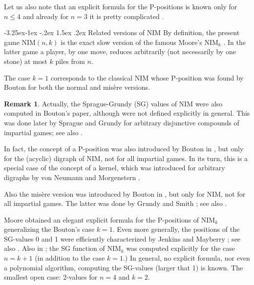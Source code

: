 \documentclass[10pt]{article}
\makeatletter
\renewcommand\subsection{\@startsection{subsection}{2}{\z@}
{-3.25ex\@plus -1ex \@minus -.2ex}
{1.5ex \@plus .2ex}
{\normalfont\normalsize\bfseries\boldmath}}
\theoremstyle{definition}
\newtheorem{remark}{Remark}
\makeatother
\begin{document}
Let us also note that 
an explicit formula for the P-positions is known 
only for $n \leq 4$  
and already for $n=3$ %
it is pretty complicated 
\cite{GHHC20}\cite[Appendix]{GMMV23}.

\subsection{Related versions of NIM} 
By definition, the present game NIM$(n,k)$ 
is the exact slow version  
of the famous Moore's NIM$_k$ \cite{Moo910}.  
In the latter game a player, by one move, 
reduces arbitrarily 
(not necessarily by one stone) 
at most $k$ piles from $n$. 

The case  $k=1$  corresponds to the classical NIM  
whose P-position was found by Bouton 
\cite{Bou901}  for both the normal and mis\`ere versions. 

\begin{remark} 
Actually, the Sprague-Grundy (SG) values
of NIM were also computed in Bouton's paper, 
although were not defined explicitly in general. This 
was done later by Sprague \cite{Spr36} 
and Grundy \cite{Gru39} for 
arbitrary disjunctive compounds 
of impartial games; see also \cite{Con76,Smi66}. 

In fact, the concept of a P-position 
was also introduced by Bouton in \cite{Bou901}, 
but only for the (acyclic) digraph of NIM, 
not for all impartial games. 
In its turn, this is a special case 
of the concept of a kernel, 
which was introduced for arbitrary digraphs 
by von Neumann and Morgenstern \cite{NM44}. 

Also the mis\`ere version 
was introduced by Bouton in \cite{Bou901},  
but only for NIM, not for all impartial games. 
The latter was done by Grundy and Smith 
\cite{GS56}; see also \cite{Con76,Gur07,Gur07a,GH18,Smi66}.
\end{remark} 

Moore \cite{Moo910} obtained an elegant explicit formula 
for the P-positions of NIM$_k$ 
generalizing the Bouton's case  $k=1$. 
Even more generally, the positions 
of the SG-values 0 and 1  were efficiently characterized by 
Jenkins and Mayberry \cite{JM80}; see also 
\cite[Section 4]{BGHMM17}.  
Also in \cite{JM80};
the SG function of NIM$_k$  
was computed explicitly for the case  $n = k+1$ 
(in addition to the case $k=1$.)  
In general, no explicit formula, 
nor even a polynomial algorithm, 
computing the SG-values 
(larger that 1)  is known. 
The smallest open case: 
2-values for  $n=4$ and $k=2$. 
\end{document}
